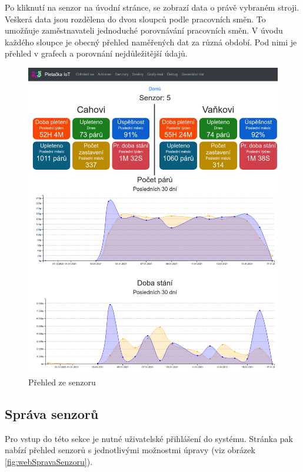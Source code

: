 Po kliknutí na senzor na úvodní stránce, se zobrazí data o právě vybraném stroji.
Veškerá data jsou rozdělena do dvou sloupců podle pracovních směn.
To umožňuje zaměstnavateli jednoduché porovnávání pracovních směn.
V úvodu každého sloupce je obecný přehled naměřených dat za různá období.
Pod nimi je přehled v grafech a porovnání nejdůležitější údajů.

\begin{figure}[htbp]
    \centering
    \includegraphics[width=\textwidth]{img/prehled.png}
    \caption{Přehled ze senzoru}
    \label{fig:webSenzory}
\end{figure}


\fxnote[author=JPA]{\textcolor{mygreen}{Aktualizovat grafy/obrázky}}


\subsection{Správa senzorů}
Pro vstup do této sekce je nutné uživatelské přihlášení do systému.
Stránka pak nabízí přehled senzorů s jednotlivými možnostmi úpravy (viz obrázek \ref{fig:webSpravaSenzoru}).

